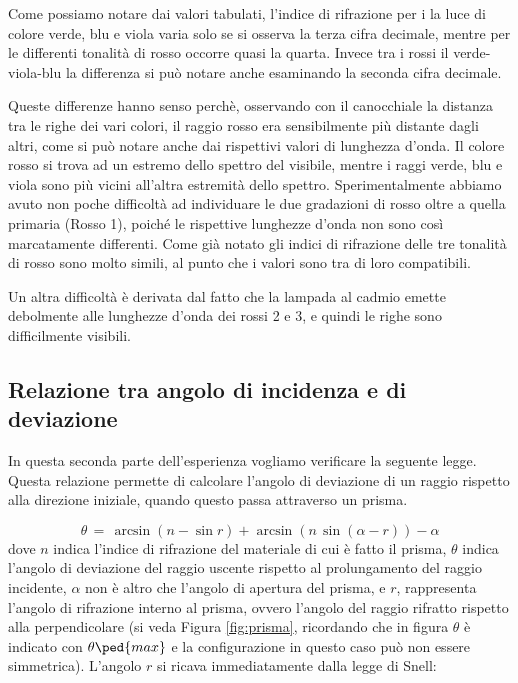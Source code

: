 Come possiamo notare dai valori tabulati, l'indice di rifrazione per i la luce di colore verde, blu e viola varia solo se si osserva la terza cifra decimale, mentre per le differenti tonalità di rosso occorre quasi la quarta. Invece tra i rossi il verde-viola-blu la differenza si può notare anche esaminando la seconda cifra decimale.

Queste differenze hanno senso perchè, osservando con il canocchiale la distanza tra le righe dei vari colori, il raggio rosso era sensibilmente più distante dagli altri, come si può notare anche dai rispettivi valori di lunghezza d'onda. Il colore rosso si trova ad un estremo dello spettro del visibile, mentre i raggi verde, blu e viola sono più vicini all'altra estremità dello spettro. Sperimentalmente abbiamo avuto non poche difficoltà ad individuare le due gradazioni di rosso oltre a quella primaria (Rosso 1), poiché le rispettive lunghezze d'onda non sono così marcatamente differenti. Come già notato gli indici di rifrazione delle tre tonalità di rosso sono molto simili, al punto che i valori sono tra di loro compatibili.

Un altra difficoltà è derivata dal fatto che la lampada al cadmio emette debolmente alle lunghezze d'onda dei rossi 2 e 3, e quindi le righe sono difficilmente visibili.

\subsection{Relazione tra angolo di incidenza e di deviazione}

In questa seconda parte dell'esperienza vogliamo verificare la seguente legge. Questa relazione permette di calcolare l'angolo di deviazione di un raggio rispetto alla direzione iniziale, quando questo passa attraverso un prisma.

\begin{equation}
	\theta \,=\, \arcsin{(n - \sin{r})} + \arcsin{(n \, \sin{(\alpha - r)})} - \alpha
	\label{eq:brutta}
\end{equation}
%
dove $n$ indica l'indice di rifrazione del materiale di cui è fatto il prisma, $\theta$ indica l'angolo di deviazione del raggio uscente rispetto al prolungamento del raggio incidente, $\alpha$ non è altro che l'angolo di apertura del prisma, e $r$, rappresenta l'angolo di rifrazione interno al prisma, ovvero l'angolo del raggio rifratto rispetto alla perpendicolare (si veda Figura \ref{fig:prisma}, ricordando che in figura $\theta$ è indicato con $\theta\ped{max}$ e la configurazione in questo caso può non essere simmetrica). L'angolo $r$ si ricava immediatamente dalla legge di Snell:

